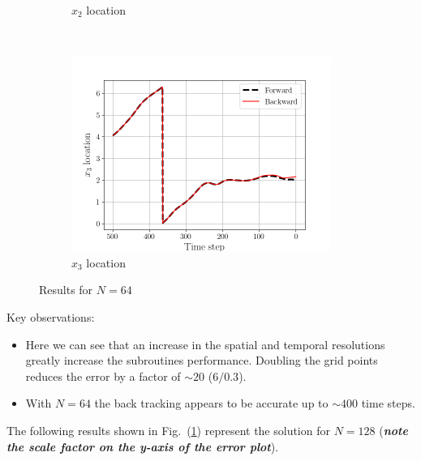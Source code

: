 \begin{figure}[H]
\begin{subfigure}[H]{0.45\textwidth}
        \caption{$x_{2}$ location}
    \end{subfigure}
    ~
    \begin{subfigure}[H]{0.45\textwidth}
        \includegraphics[height=2.5in]{media/rk4/run-64/x3-64-tracking.png}
        \caption{$x_{3}$ location}
    \end{subfigure}
    \caption{Results for $N=64$}
    \label{fig:back-tracking-64}
\end{figure}
Key observations:
\begin{itemize}
    \item Here we can see that an increase in the spatial and temporal
        resolutions greatly increase the subroutines performance. Doubling
        the grid points reduces the error by a factor of $\sim20$ ($6/0.3$).
    \item With $N=64$ the back tracking appears to be accurate up to $\sim
        400$ time steps.
\end{itemize}

The following results shown in Fig.~(\ref{fig:back-tracking-64}) represent
the solution for $N=128$ (\emph{\textbf{note the scale factor on the
y-axis of the error plot}}).

